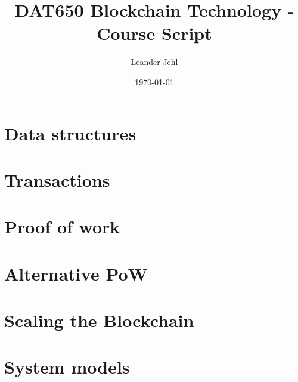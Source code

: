 \documentclass[a4paper,11pt,draft]{report}
\begin{document}
	\title{DAT650 Blockchain Technology - Course Script}
	\author{Leander Jehl}
	\date{\today}
	
	\maketitle

\chapter{Data structures}
\label{ch:hashchain}
	






\chapter{Transactions}
\label{ch:transaction}



\chapter{Proof of work}




\chapter{Alternative PoW}


\chapter{Scaling the Blockchain}


\chapter{System models}

\end{document}
